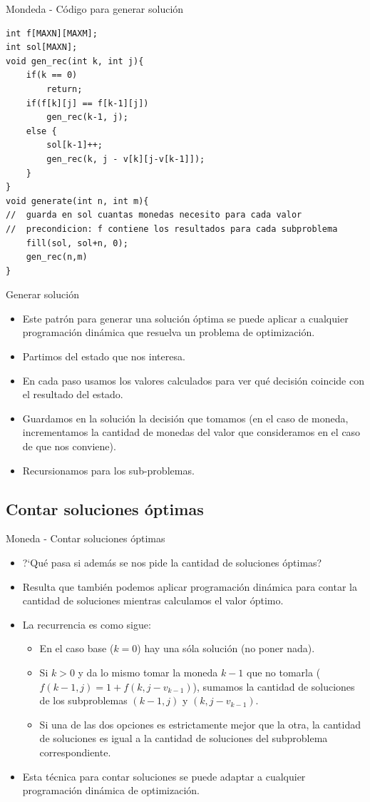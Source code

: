 \documentclass{beamer}
\begin{document}
\begin{frame}[fragile]{Mondeda - C\'odigo para generar soluci\'on}
\begin{lstlisting}
int f[MAXN][MAXM];
int sol[MAXN];
void gen_rec(int k, int j){
	if(k == 0)
		return;
	if(f[k][j] == f[k-1][j])
		gen_rec(k-1, j);
	else {
		sol[k-1]++;
		gen_rec(k, j - v[k][j-v[k-1]]);
	}
}
void generate(int n, int m){
//	guarda en sol cuantas monedas necesito para cada valor
//	precondicion: f contiene los resultados para cada subproblema
	fill(sol, sol+n, 0);
	gen_rec(n,m)
}
\end{lstlisting}
\end{frame}
\begin{frame}{Generar soluci\'on}
\begin{itemize}
\item
Este patr\'on para generar una soluci\'on \'optima se puede aplicar a cualquier programaci\'on din\'amica que resuelva un problema de optimizaci\'on.
\item
Partimos del estado que nos interesa.
\item
En cada paso usamos los valores calculados para ver qu\'e decisi\'on coincide con el resultado del estado.
\item
Guardamos en la soluci\'on la decisi\'on que tomamos (en el caso de moneda, incrementamos la cantidad de monedas del valor que consideramos en el caso de que nos conviene).
\item
Recursionamos para los sub-problemas.
\end{itemize}
\end{frame}

\subsection{Contar soluciones \'optimas}

\begin{frame}{Moneda - Contar soluciones \'optimas}
\begin{itemize}
\item
?`Qu\'e pasa si adem\'as se nos pide la cantidad de soluciones \'optimas?
\item
Resulta que tambi\'en podemos aplicar programaci\'on din\'amica para contar la cantidad de soluciones mientras calculamos el valor \'optimo.
\item
La recurrencia es como sigue:
\begin{itemize}
\item
En el caso base ($k=0$) hay una s\'ola soluci\'on (no poner nada).
\item
Si $k>0$ y da lo mismo tomar la moneda $k-1$ que no tomarla ($f(k-1,j) = 1 + f(k,j-v_{k-1})$), sumamos la cantidad de soluciones de los subproblemas  $(k-1,j)$ y $(k,j-v_{k-1})$.
\item
Si una de las dos opciones es estrictamente mejor que la otra, la cantidad de soluciones es igual a la cantidad de soluciones del subproblema correspondiente.
\end{itemize}
\item
Esta t\'ecnica para contar soluciones se puede adaptar a cualquier programaci\'on din\'amica de optimizaci\'on.
\end{itemize}
\end{frame}
\end{document}
